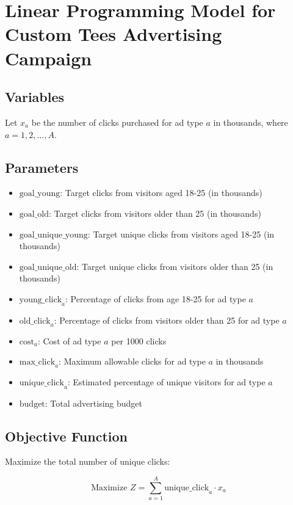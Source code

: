 \documentclass{article}
\begin{document}
\section*{Linear Programming Model for Custom Tees Advertising Campaign}

\subsection*{Variables}
Let \( x_a \) be the number of clicks purchased for ad type \( a \) in thousands, where \( a = 1, 2, \ldots, A \).

\subsection*{Parameters}
\begin{itemize}
    \item \( \text{goal\_young} \): Target clicks from visitors aged 18-25 (in thousands)
    \item \( \text{goal\_old} \): Target clicks from visitors older than 25 (in thousands)
    \item \( \text{goal\_unique\_young} \): Target unique clicks from visitors aged 18-25 (in thousands)
    \item \( \text{goal\_unique\_old} \): Target unique clicks from visitors older than 25 (in thousands)
    \item \( \text{young\_click}_{a} \): Percentage of clicks from age 18-25 for ad type \( a \)
    \item \( \text{old\_click}_{a} \): Percentage of clicks from visitors older than 25 for ad type \( a \)
    \item \( \text{cost}_{a} \): Cost of ad type \( a \) per 1000 clicks
    \item \( \text{max\_click}_{a} \): Maximum allowable clicks for ad type \( a \) in thousands
    \item \( \text{unique\_click}_{a} \): Estimated percentage of unique visitors for ad type \( a \)
    \item \( \text{budget} \): Total advertising budget
\end{itemize}

\subsection*{Objective Function}
Maximize the total number of unique clicks:

\[
\text{Maximize } Z = \sum_{a=1}^{A} \text{unique\_click}_{a} \cdot x_a
\]
\end{document}
